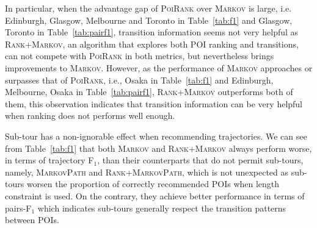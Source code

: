 In particular, when the advantage gap of \textsc{PoiRank} over \textsc{Markov} is large,
i.e. Edinburgh, Glasgow, Melbourne and Toronto in Table~\ref{tab:f1} and Glasgow, Toronto in Table~\ref{tab:pairf1},
transition information seems not very helpful as \textsc{Rank+Markov}, an algorithm that explores both POI ranking and transitions,
can not compete with \textsc{PoiRank} in both metrics, but nevertheless brings improvements to \textsc{Markov}.
However, as the performance of \textsc{Markov} approaches or surpasses that of \textsc{PoiRank},
i.e., Osaka in Table~\ref{tab:f1} and Edinburgh, Melbourne, Osaka in Table~\ref{tab:pairf1},
\textsc{Rank+Markov} outperforms both of them, this observation indicates that transition information can be very helpful when
ranking does not performs well enough.

Sub-tour has a non-ignorable effect when recommending trajectories.
We can see from Table~\ref{tab:f1} that both \textsc{Markov} and \textsc{Rank+Markov} always perform worse,
in terms of trajectory F$_1$, than
their counterparts that do not permit sub-tours, namely, \textsc{MarkovPath} and \textsc{Rank+MarkovPath},
which is not unexpected as sub-tours worsen the proportion of correctly
recommended POIs when length constraint is used.
On the contrary, they achieve better performance in terms of pairs-F$_1$ which indicates sub-tours generally
respect the transition patterns between POIs.

